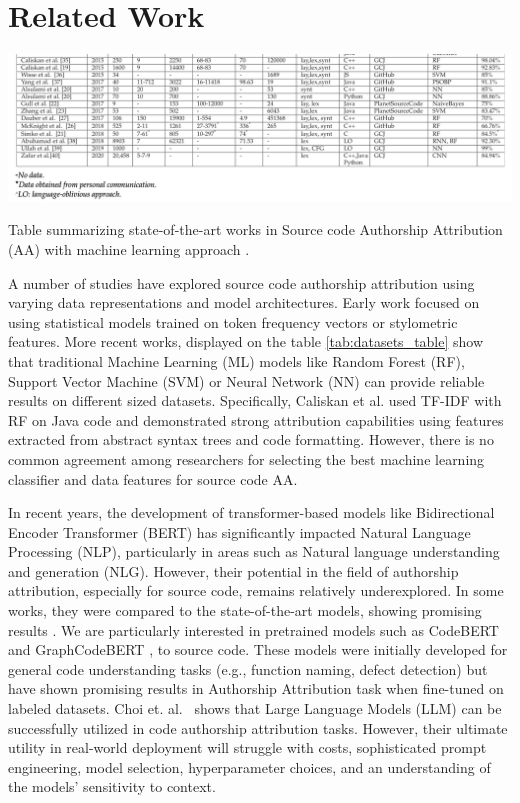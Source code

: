 \documentclass[conference]{IEEEtran}
\begin{document}
\section{Related Work}

\begin{table}[!t]
    \centering
    \includegraphics[width=0.7\linewidth]{figures/dataset_table.png}
    \caption{Table summarizing state-of-the-art works in Source code Authorship Attribution (AA) with machine learning approach \citet{datasets}.}
    \label{tab:datasets_table}
\end{table}

A number of studies have explored source code authorship attribution using varying 
data representations and model architectures. Early work focused on using statistical
models trained on token frequency vectors or stylometric features. More recent works, 
displayed on the table \ref{tab:datasets_table} show that traditional Machine
Learning (ML) models like Random Forest (RF), Support Vector Machine (SVM) or
Neural Network (NN) can provide reliable results on different sized datasets. 
Specifically, Caliskan et al. \citet{caliskan} used TF-IDF with RF on 
Java code and demonstrated strong attribution capabilities using features extracted 
from abstract syntax trees and code formatting. However, there is no common 
agreement among researchers for selecting the best machine learning classifier 
and data features for source code AA. 

In recent years, the development of transformer-based models like Bidirectional Encoder Transformer (BERT) has 
significantly impacted Natural 
Language Processing (NLP), particularly in areas such as Natural language 
understanding and generation (NLG). However, their potential in the field 
of authorship attribution, especially for source code, remains relatively 
underexplored. In some works, they were compared to the state-of-the-art 
models, showing promising results \citet{fi}. We are particularly interested 
in pretrained models such as CodeBERT and GraphCodeBERT \citet{codebert}, 
to source code. These models were initially developed for general code 
understanding tasks (e.g., function naming, defect detection) but have shown 
promising results in Authorship Attribution task when fine-tuned on labeled datasets. 
Choi et. al.~\citet{choi} shows that Large Language Models (LLM) can be successfully utilized in 
code authorship attribution tasks. However, their ultimate utility in 
real-world deployment will struggle with costs, sophisticated prompt engineering, 
model selection, hyperparameter
choices, and an understanding of the models’ sensitivity to
context. 
\end{document}
